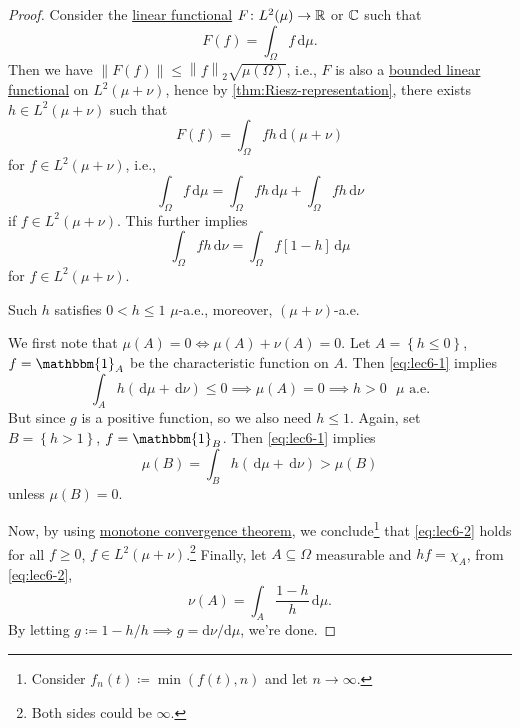 \begin{proof}
	Consider the \hyperref[def:linear-functional]{linear functional} \(F\colon L^2(\mu ) \to \mathbb{\MakeUppercase{r}} \) or \(\mathbb{\MakeUppercase{c}} \) such that
	\[
		F(f) = \int _{\Omega }f\,\mathrm{d} \mu .
	\]
	Then we have \(\left\lVert F(f)\right\rVert \leq \left\lVert f\right\rVert _2 \sqrt{ \mu (\Omega )}\), i.e., \(F\) is also a \hyperref[def:bounded-linear-functional]{bounded linear functional} on \(L^2(\mu + \nu )\), hence by \autoref{thm:Riesz-representation}, there exists \(h\in L^2(\mu +\nu )\) such that
	\[
		F(f) = \int_\Omega  fh\,\mathrm{d} (\mu +\nu )
	\]
	for \(f\in L^2(\mu + \nu )\), i.e.,
	\begin{equation}\label{eq:lec6-1}
		\int _\Omega f\,\mathrm{d} \mu = \int _\Omega fh\,\mathrm{d} \mu + \int _\Omega fh \,\mathrm{d} \nu
	\end{equation}
	if \(f\in L^2(\mu +\nu )\). This further implies
	\begin{equation}\label{eq:lec6-2}
		\int _\Omega fh\,\mathrm{d} \nu = \int _\Omega f[1 - h] \,\mathrm{d} \mu
	\end{equation}
	for \(f\in L^2(\mu + \nu )\).
	\begin{claim}
		Such \(h\) satisfies \(0 < h \leq 1\) \(\mu\)-a.e., moreover, \((\mu+\nu )\)-a.e.
	\end{claim}
	\begin{explanation}
		We first note that \(\mu (A) = 0 \iff \mu (A) + \nu (A) = 0\). Let \(A = \left\{ h \leq 0 \right\} \), \(f = \mathbbm{1}_{A}\) be the characteristic function on \(A\). Then \autoref{eq:lec6-1} implies
		\[
			\int _A h ( \,\mathrm{d} \mu  + \,\mathrm{d} \nu ) \leq 0 \implies \mu (A) = 0 \implies h > 0 \text{ \(\mu\) a.e.}
		\]
		But since \(g\) is a positive function, so we also need \(h \leq 1\). Again, set \(B = \left\{ h > 1 \right\} \), \(f = \mathbbm{1}_{B}\). Then \autoref{eq:lec6-1} implies
		\[
			\mu (B) = \int _B h \left( \,\mathrm{d} \mu + \,\mathrm{d} \nu  \right) > \mu (B)
		\]
		unless \(\mu (B) = 0\).
	\end{explanation}


	Now, by using \href{https://en.wikipedia.org/wiki/Monotone_convergence_theorem}{monotone convergence theorem}, we conclude\footnote{Consider \(f_n(t) \coloneqq \min (f(t), n)\) and let \(n\to \infty \).} that \autoref{eq:lec6-2} holds for all \(f \geq 0\), \(f\in L^2(\mu + \nu )\).\footnote{Both sides could be \(\infty\).} Finally, let \(A\subseteq \Omega \) measurable and \(hf = \chi _A\), from \autoref{eq:lec6-2},
	\[
		\nu (A) = \int _A \frac{1 - h}{h}\,\mathrm{d} \mu.
	\]
	By letting \(g \coloneqq 1 - h / h \implies g = \mathrm{d}\nu /\mathrm{d}\mu\), we're done.
\end{proof}

